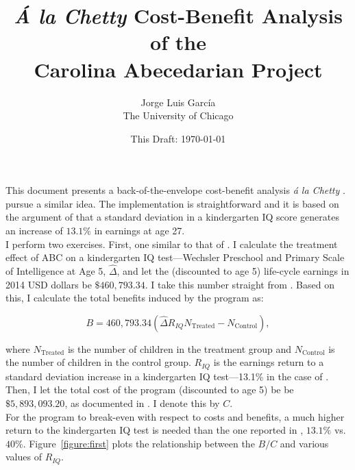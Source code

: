 




\title{\Large \textbf{\textit{\'{A} la Chetty} Cost-Benefit Analysis of the \\ Carolina Abecedarian Project}}

\author{
Jorge Luis Garc\'{i}a\\
The University of Chicago}
\date{This Draft: \today}
\maketitle

\noindent This document presents a back-of-the-envelope cost-benefit analysis \textit{\'{a} la Chetty} \citep{Chetty_Friedman_etal_2010_HowDoesYour}. \citet{Kline-Walters_2015_NBER-Evaluating} pursue a similar idea. The implementation is straightforward and it is based on the argument of  \citet{Chetty_Friedman_etal_2010_HowDoesYour} that a standard deviation in a kindergarten IQ score generates an increase of $13.1\%$ in earnings at age 27.\\

\noindent I perform two exercises. First, one similar to that of \citet{Kline-Walters_2015_NBER-Evaluating}. I calculate the treatment effect of ABC on a kindergarten IQ test---Wechsler Preschool and Primary Scale of Intelligence at Age 5, $\widehat{\Delta}$, and let the (discounted to age 5) life-cycle earnings in 2014 USD dollars be $\$460,793.34$. I take this number straight from \citet{Kline-Walters_2015_NBER-Evaluating}. Based on this, I calculate the total benefits induced by the program as: 

\begin{equation}
B = 460,793.34 \left( \widehat{\Delta} R_{IQ}  N_{\text{Treated}}  -  N_{\text{Control}} \right) , 
\end{equation}

\noindent where $N_{\text{Treated}}$ is the number of children in the treatment group and $N_{\text{Control}}$ is the number of children in the control group. $R_{IQ}$ is the earnings return to a standard deviation increase in a kindergarten IQ test---13.1\% in the case of \citep{Chetty_Friedman_etal_2010_HowDoesYour}. Then, I let the total cost of the program (discounted to age 5) be  be $\$5,893,093.20$, as documented in \citet{Garcia-etal_2016_Analyzing}. I denote this by $C$.\\ 

\noindent For the program to break-even with respect to costs and benefits, a much higher return to the kindergarten IQ test is needed than the one reported in \citep{Chetty_Friedman_etal_2010_HowDoesYour}, $13.1\%$ vs. $40\%$. Figure~\ref{figure:first} plots the relationship between the $B/C$ and various values of $R_{IQ}$.\\ 

